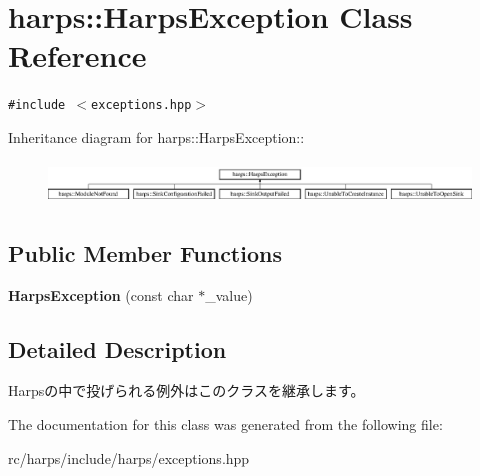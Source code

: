 \section{harps::HarpsException Class Reference}
\label{classharps_1_1HarpsException}
{\tt \#include $<$exceptions.hpp$>$}

Inheritance diagram for harps::HarpsException::\begin{figure}[H]
\begin{center}
\leavevmode
\includegraphics[height=1.14286cm]{classharps_1_1HarpsException}
\end{center}
\end{figure}
\subsection*{Public Member Functions}
\begin{CompactItemize}
\item 
\textbf{HarpsException} (const char $\ast$\_\-value)\label{classharps_1_1HarpsException_1c1c3000d2e0184cbeedb07d13c80eb4}

\end{CompactItemize}


\subsection{Detailed Description}
Harpsの中で投げられる例外はこのクラスを継承します。 

The documentation for this class was generated from the following file:\begin{CompactItemize}
\item 
rc/harps/include/harps/exceptions.hpp\end{CompactItemize}
